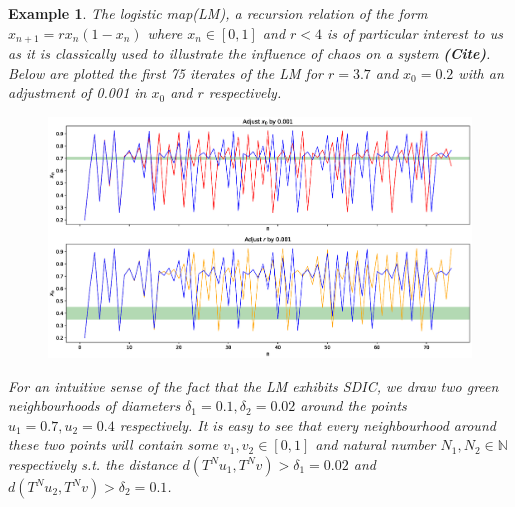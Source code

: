 \documentclass[a4paper,12pt,twoside]{report}
\newtheorem{Example}{Example}[]
\begin{document}
\begin{Example}
  The logistic map(LM), a recursion relation of the form $x_{n+1}=rx_n(1-x_n)$ where $x_n\in[0,1]$ and $r<4$ is of particular interest to us as it is classically used to illustrate the influence of chaos on a system \textbf{(Cite)}. Below are plotted the first 75 iterates of the LM for $r=3.7$ and $x_0=0.2$ with an adjustment of 0.001 in $x_0$ and $r$ respectively.

  \begin{figure}[ht]
    \includegraphics[scale=0.45]{_log_sdic.eps}
        \centering
        \label{fig:log_sdic}
      \end{figure}
  
  For an intuitive sense of the fact that the LM exhibits SDIC, we draw two green neighbourhoods of diameters $\delta_1=0.1, \delta_2=0.02$ around the points $u_1=0.7, u_2=0.4$ respectively. It is easy to see that every neighbourhood around these two points will contain some $v_1, v_2\in[0,1]$ and natural number $N_1, N_2 \in\mathbb{N}$ respectively s.t. the distance $d(T^Nu_1,T^Nv)>\delta_1=0.02$ and $d(T^Nu_2,T^Nv)>\delta_2=0.1$. 
  

\end{Example}
\end{document}
